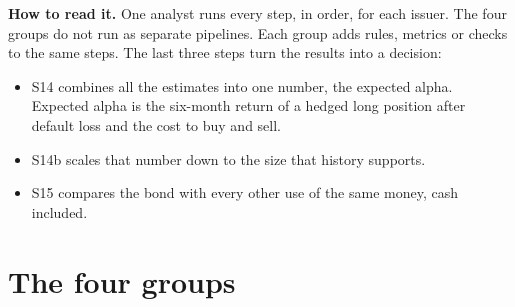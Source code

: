 \documentclass[11pt]{article}
\begin{document}
\textbf{How to read it.} One analyst runs every step, in order, for each issuer. The four groups do not run as separate pipelines. Each group adds rules, metrics or checks to the same steps. The last three steps turn the results into a decision:
\begin{itemize}\itemsep0pt
\item S14 combines all the estimates into one number, the expected alpha. Expected alpha is the six-month return of a hedged long position after default loss and the cost to buy and sell.
\item S14b scales that number down to the size that history supports.
\item S15 compares the bond with every other use of the same money, cash included.
\end{itemize}
\newpage
\section*{The four groups}
\end{document}

